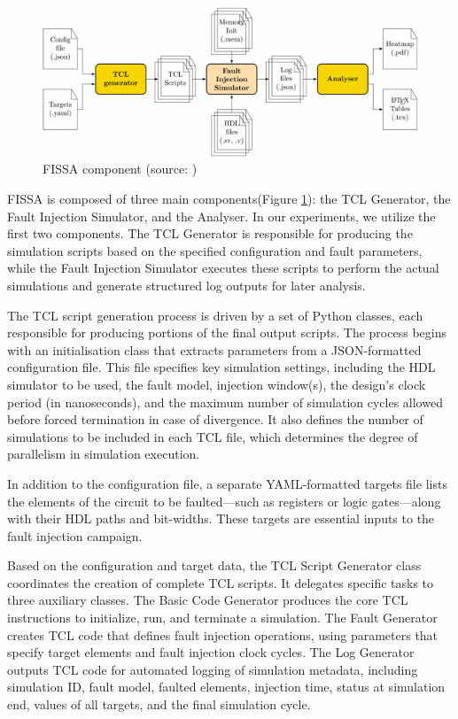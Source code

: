 \begin{figure}[t!]
  \centering
  \includegraphics[width=0.5\linewidth]{Chapitre2/figures/fissa.png}
  \caption{FISSA component (source: \cite{PLG-24-dsd})}
  \label{fissa}
\end{figure}

FISSA is composed of three main components(Figure \ref{fissa}): the TCL Generator, the Fault Injection Simulator, and the Analyser. In our experiments, we utilize the first two components. The TCL Generator is responsible for producing the simulation scripts based on the specified configuration and fault parameters, while the Fault Injection Simulator executes these scripts to perform the actual simulations and generate structured log outputs for later analysis.

The TCL script generation process is driven by a set of Python classes, each responsible for producing portions of the final output scripts. The process begins with an initialisation class that extracts parameters from a JSON-formatted configuration file. This file specifies key simulation settings, including the HDL simulator to be used, the fault model, injection window(s), the design’s clock period (in nanoseconds), and the maximum number of simulation cycles allowed before forced termination in case of divergence. It also defines the number of simulations to be included in each TCL file, which determines the degree of parallelism in simulation execution.

In addition to the configuration file, a separate YAML-formatted targets file lists the elements of the circuit to be faulted—such as registers or logic gates—along with their HDL paths and bit-widths. These targets are essential inputs to the fault injection campaign.

Based on the configuration and target data, the TCL Script Generator class coordinates the creation of complete TCL scripts. It delegates specific tasks to three auxiliary classes. The Basic Code Generator produces the core TCL instructions to initialize, run, and terminate a simulation. The Fault Generator creates TCL code that defines fault injection operations, using parameters that specify target elements and fault injection clock cycles. The Log Generator outputs TCL code for automated logging of simulation metadata, including simulation ID, fault model, faulted elements, injection time, status at simulation end, values of all targets, and the final simulation cycle.

